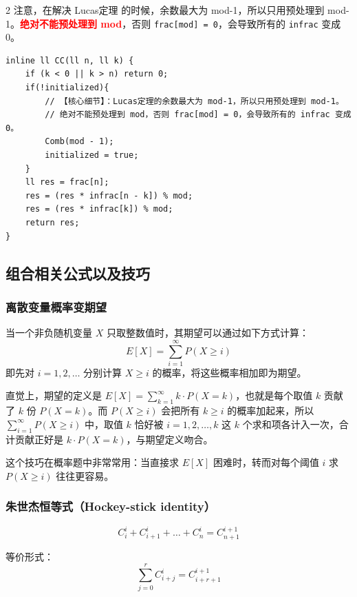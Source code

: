 \begin{multicols*}{2}
		注意，在解决 Lucas定理 的时候，余数最大为 mod-1，所以只用预处理到 mod-1。\textcolor{red}{\textbf{绝对不能预处理到 mod}}，否则 \verb|frac[mod] = 0|，会导致所有的 \verb|infrac| 变成 0。

		\begin{verbatim}
inline ll CC(ll n, ll k) {
	if (k < 0 || k > n) return 0;
	if(!initialized){
		// 【核心细节】：Lucas定理的余数最大为 mod-1，所以只用预处理到 mod-1。
		// 绝对不能预处理到 mod，否则 frac[mod] = 0，会导致所有的 infrac 变成 0。
		Comb(mod - 1);
		initialized = true;
	}
	ll res = frac[n];
	res = (res * infrac[n - k]) % mod;
	res = (res * infrac[k]) % mod;
	return res;
}
		\end{verbatim}

		\subsection{组合相关公式以及技巧}

		\subsubsection{离散变量概率变期望}

		当一个非负随机变量 $X$ 只取整数值时，其期望可以通过如下方式计算：
		$$E[X] = \sum_{i=1}^{\infty} P(X \ge i)$$
		即先对 $i = 1, 2, \dots$ 分别计算 $X \ge i$ 的概率，将这些概率相加即为期望。

		直觉上，期望的定义是 $E[X] = \sum_{k=1}^{\infty} k \cdot P(X=k)$，也就是每个取值 $k$ 贡献了 $k$ 份 $P(X=k)$。而 $P(X \ge i)$ 会把所有 $k \ge i$ 的概率加起来，所以 $\sum_{i=1}^{\infty} P(X \ge i)$ 中，取值 $k$ 恰好被 $i=1, 2, \dots, k$ 这 $k$ 个求和项各计入一次，合计贡献正好是 $k \cdot P(X=k)$，与期望定义吻合。

		这个技巧在概率题中非常常用：当直接求 $E[X]$ 困难时，转而对每个阈值 $i$ 求 $P(X \ge i)$ 往往更容易。

		\subsubsection{朱世杰恒等式（Hockey-stick identity）}

		$$C_i^i + C_{i+1}^i + \dots + C_n^i = C_{n+1}^{i+1}$$

		等价形式：
		$$\sum_{j=0}^{r} C_{i+j}^{i} = C_{i+r+1}^{i+1}$$


\end{multicols*}
